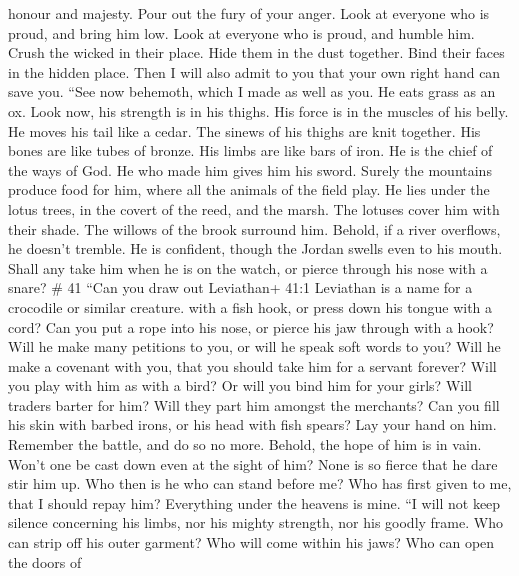 honour and majesty.  Pour out the fury of your anger. Look
at everyone who is proud, and bring him low.  Look at
everyone who is proud, and humble him. Crush the wicked in their place.
 Hide them in the dust together. Bind their faces in the
hidden place.  Then I will also admit to you that your own
right hand can save you.  ``See now behemoth, which I made
as well as you. He eats grass as an ox.  Look now, his
strength is in his thighs. His force is in the muscles of his belly.
 He moves his tail like a cedar. The sinews of his thighs
are knit together.  His bones are like tubes of bronze. His
limbs are like bars of iron.  He is the chief of the ways
of God. He who made him gives him his sword.  Surely the
mountains produce food for him, where all the animals of the field play.
 He lies under the lotus trees, in the covert of the reed,
and the marsh.  The lotuses cover him with their shade. The
willows of the brook surround him.  Behold, if a river
overflows, he doesn't tremble. He is confident, though the Jordan swells
even to his mouth.  Shall any take him when he is on the
watch, or pierce through his nose with a snare? \# 41  ``Can
you draw out Leviathan+ 41:1 Leviathan is a name for a crocodile or
similar creature. with a fish hook, or press down his tongue with a
cord?  Can you put a rope into his nose, or pierce his jaw
through with a hook?  Will he make many petitions to you, or
will he speak soft words to you?  Will he make a covenant
with you, that you should take him for a servant forever? 
Will you play with him as with a bird? Or will you bind him for your
girls?  Will traders barter for him? Will they part him
amongst the merchants?  Can you fill his skin with barbed
irons, or his head with fish spears?  Lay your hand on him.
Remember the battle, and do so no more.  Behold, the hope of
him is in vain. Won't one be cast down even at the sight of him?
 None is so fierce that he dare stir him up. Who then is he
who can stand before me?  Who has first given to me, that I
should repay him? Everything under the heavens is mine. 
``I will not keep silence concerning his limbs, nor his mighty strength,
nor his goodly frame.  Who can strip off his outer garment?
Who will come within his jaws?  Who can open the doors of
